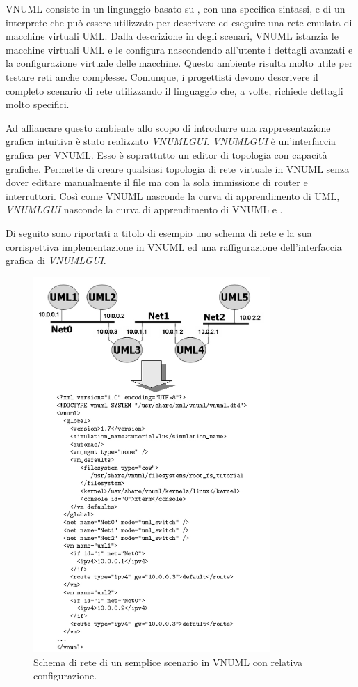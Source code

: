 VNUML consiste in un linguaggio basato su \xml{}, con una specifica sintassi, e di un interprete che può essere utilizzato per descrivere ed eseguire una rete emulata di macchine virtuali UML.
Dalla descrizione in \xml{} degli scenari, VNUML istanzia le macchine virtuali UML e le configura nascondendo all'utente i dettagli avanzati e la configurazione virtuale delle macchine. Questo ambiente risulta molto utile per testare reti anche complesse. Comunque, i progettisti devono descrivere il completo scenario di rete utilizzando il linguaggio \xml{} che, a volte, richiede dettagli molto specifici.

Ad affiancare questo ambiente allo scopo di introdurre una rappresentazione grafica intuitiva è stato realizzato \emph{VNUMLGUI}\cite{VNUMLGUI}. \emph{VNUMLGUI} è un'interfaccia grafica per VNUML.
Esso è soprattutto un editor di topologia con capacità grafiche. Permette di creare qualsiasi topologia di rete virtuale in VNUML senza dover editare manualmente il file \xml{} ma con la sola immissione di router e interruttori.
Così come VNUML nasconde la curva di apprendimento di UML, \emph{VNUMLGUI} nasconde la curva di apprendimento di VNUML e \xml{}.

Di seguito sono riportati a titolo di esempio uno schema di rete e la sua corrispettiva implementazione in VNUML ed una raffigurazione dell'interfaccia grafica di \emph{VNUMLGUI}.

\begin{figure}[!ht]
	\centering
	\includegraphics[width=9cm]{images/vnuml_01.png}
	\caption{Schema di rete di un semplice scenario in VNUML con relativa configurazione.}
	\label{figura:vnuml_gui}
\end{figure}

